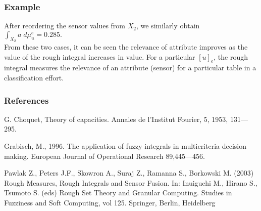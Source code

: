 \documentclass[envcountsect]{beamer}
\begin{document}
\begin{frame}
	\frametitle{Example}
	After reordering the sensor values from $X_2$, we similarly obtain $\int_{X_{2}} a \; d\mu_u^e = 0.285.$ \\ 
	\vfill
	From these two cases, it can be seen the relevance of attribute improves as the value of the rough integral increases in value. For a particular $[u]_e$, the rough integral measures the relevance of an attribute (sensor) for a particular table in a classification effort. \\
\end{frame}
\begin{frame}
	\frametitle{References}
	G. Choquet, Theory of capacities. Annales de l'Institut Fourier, 5, 1953, 131---295.\\
	\vfill

Grabisch, M., 1996. The application of fuzzy integrals in multicriteria decision making. European Journal of Operational Research 89,445---456.
	\vfill

Pawlak Z., Peters J.F., Skowron A., Suraj Z., Ramanna S., Borkowski M. (2003) Rough Measures, Rough Integrals and Sensor Fusion. In: Inuiguchi M., Hirano S., Tsumoto S. (eds) Rough Set Theory and Granular Computing. Studies in Fuzziness and Soft Computing, vol 125. Springer, Berlin, Heidelberg

\end{frame}
	
\end{document}
